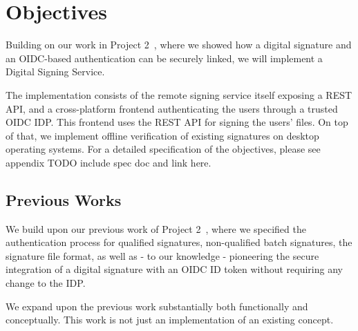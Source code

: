\chapter{Objectives}
\label{ch:objectives}

Building on our work in Project 2~\cite{projekt2},
where we showed how a digital signature and an \gls{OIDC}-based authentication can be securely linked,
we will implement a Digital Signing Service.

The implementation consists of the remote signing service itself exposing a \gls{REST} \gls{API},
and a cross-platform frontend authenticating the users through a trusted \gls{OIDC} \gls{IDP}.
This frontend uses the \gls{REST} \gls{API} for signing the users' files.
On top of that, we implement offline verification of existing signatures on desktop operating systems.
For a detailed specification of the objectives, please see appendix TODO include spec doc and link here.

\section{Previous Works}
\label{section:previousworks}

We build upon our previous work of Project 2~\cite{projekt2}, where we specified the authentication process
for qualified signatures, non-qualified batch signatures, the signature file format,
as well as - to our knowledge - pioneering the secure integration of a digital signature with an \gls{OIDC} ID token without requiring any change to the \gls{IDP}.

We expand upon the previous work substantially both functionally and conceptually.
This work is not just an implementation of an existing concept.

